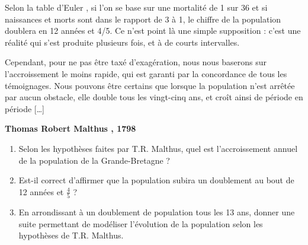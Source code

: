 \documentclass[oneside,12pt]{article}          %
\begin{document}
\begin{tcolorbox}[
    enhanced , arc = 0pt , top = 4mm ,
    colback = white ,
    fonttitle = \bfseries , title = {Document \no 1 : Extrait de \og Essai sur le principe de population \fg} , boxed title style = {arc = 0pt} ,
    coltitle = black , colbacktitle = black!10 ,
    attach boxed title to top left = {xshift = 5mm , yshift = -4mm} ,
	]	

	{\ttfamily\itshape\restoreskip
	
	Selon la table d’Euler \footnotemark[2], si l’on se base sur une mortalité de 1 sur 36 et si naissances et	morts sont dans le rapport de 3 à 1, le chiffre de la population doublera en 12 années et 4/5. Ce n’est point là une simple supposition : c’est une réalité qui s’est produite plusieurs fois, et à de courts intervalles.
	
	Cependant, pour ne pas être taxé d’exagération, nous nous baserons sur l’accroissement le moins rapide, qui est garanti par la concordance de tous les témoignages. Nous pouvons être certains que lorsque la population n’est arrêtée par aucun obstacle, elle double tous les vingt-cinq ans, et croît ainsi de période en période [\ldots]
	}
	\begin{flushright}
	    \textbf{Thomas Robert Malthus , 1798}
	\end{flushright}
\end{tcolorbox}



\begin{tcolorbox}[
    enhanced , arc = 3pt , top = 4mm ,
    fonttitle = \bfseries , title = Questions sur le document \no 1  , boxed title style = {arc = 3pt} ,
    coltitle = black , colbacktitle = white ,
    attach boxed title to top left = {xshift = 5mm , yshift = -4mm} ,
	]

	\begin{enumerate}
		\item Selon les hypothèses faites par T.R. Malthus, quel est l’accroissement annuel de la population de la Grande-Bretagne ?
		\item Est-il correct d'affirmer que la population subira un doublement au bout de 12 années et $\frac{4}{5}$ ?
		\item En arrondissant à un doublement de population tous les 13 ans, donner une suite permettant de modéliser l'évolution de la population selon les hypothèses de T.R. Malthus.
	\end{enumerate}
\end{tcolorbox}
\end{document}
